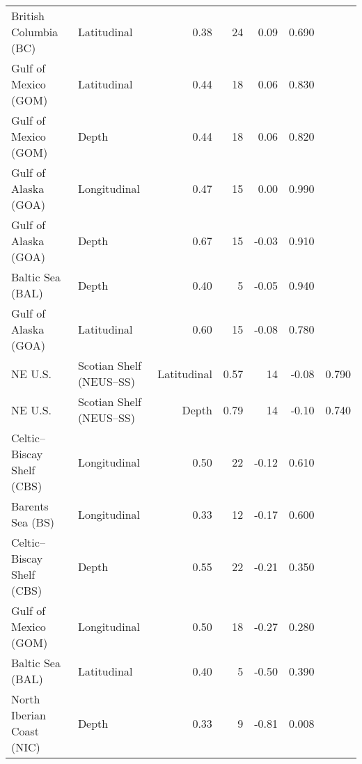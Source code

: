 \begin{table}
\begin{tabular}[t]{llrrrr}
British Columbia (BC) & Latitudinal & 0.38 & 24 & 0.09 & 0.690\\
Gulf of Mexico (GOM) & Latitudinal & 0.44 & 18 & 0.06 & 0.830\\
\addlinespace
Gulf of Mexico (GOM) & Depth & 0.44 & 18 & 0.06 & 0.820\\
Gulf of Alaska (GOA) & Longitudinal & 0.47 & 15 & 0.00 & 0.990\\
Gulf of Alaska (GOA) & Depth & 0.67 & 15 & -0.03 & 0.910\\
Baltic Sea (BAL) & Depth & 0.40 & 5 & -0.05 & 0.940\\
Gulf of Alaska (GOA) & Latitudinal & 0.60 & 15 & -0.08 & 0.780\\
\addlinespace
NE U.S. & Scotian Shelf (NEUS–SS) & Latitudinal & 0.57 & 14 & -0.08 & 0.790\\
NE U.S. & Scotian Shelf (NEUS–SS) & Depth & 0.79 & 14 & -0.10 & 0.740\\
Celtic–Biscay Shelf (CBS) & Longitudinal & 0.50 & 22 & -0.12 & 0.610\\
Barents Sea (BS) & Longitudinal & 0.33 & 12 & -0.17 & 0.600\\
Celtic–Biscay Shelf (CBS) & Depth & 0.55 & 22 & -0.21 & 0.350\\
\addlinespace
Gulf of Mexico (GOM) & Longitudinal & 0.50 & 18 & -0.27 & 0.280\\
Baltic Sea (BAL) & Latitudinal & 0.40 & 5 & -0.50 & 0.390\\
North Iberian Coast (NIC) & Depth & 0.33 & 9 & -0.81 & 0.008\\
\bottomrule
\end{tabular}
\end{table}
